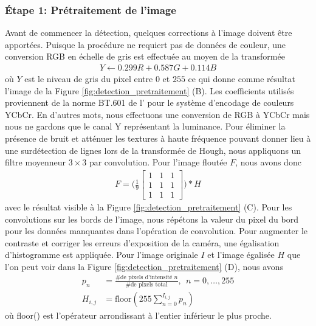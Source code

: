 \subsubsection{Étape 1: Prétraitement de l'image} Avant de commencer la détection, quelques corrections à l'image doivent être apportées. Puisque la procédure ne requiert pas de données de couleur, une conversion RGB en échelle de gris est effectuée au moyen de la transformée
\begin{align}
 Y \leftarrow 0.299 R + 0.587 G + 0.114 B
 \label{eq:rgb2gray}
\end{align}
où $Y$ est le niveau de gris du pixel entre $0$ et $255$ ce qui donne comme résultat l'image de la Figure \ref{fig:detection_pretraitement} (B). Les coefficients utilisés proviennent de la norme BT.601 de l'\cite{BT601Stu24online} pour le système d'encodage de couleurs YCbCr. En d'autres mots, nous effectuons une conversion de RGB à YCbCr mais nous ne gardons que le canal Y représentant la luminance. Pour éliminer la présence de bruit et atténuer les textures à haute fréquence pouvant donner lieu à une surdétection de lignes lors de la transformée de Hough, nous appliquons un filtre moyenneur $3 \times 3$ par convolution. Pour l'image floutée $F$, nous avons donc
\begin{align}
  F = \Bigg(\frac{1}{9}
    \begin{bmatrix}
      1 & 1 & 1\\
      1 & 1 & 1\\
      1 & 1 & 1
    \end{bmatrix}
  \Bigg) * H
  \label{eq:boxfilter}
\end{align}
avec le résultat visible à la Figure \ref{fig:detection_pretraitement} (C). Pour les convolutions sur les bords de l'image, nous répétons la valeur du pixel du bord pour les données manquantes dans l'opération de convolution. Pour augmenter le contraste et corriger les erreurs d'exposition de la caméra, une égalisation d'histogramme est appliquée. Pour l'image originale $I$ et l'image égalisée $H$ que l'on peut voir dans la Figure \ref{fig:detection_pretraitement} (D), nous avons
\begin{align}
  p_n &= \frac{\text{\# de pixels d'intensité } n }{\text{\# de pixels total}}, \ \ n = 0, \ldots, 255 \\
  H_{i,j} &= \text{floor}(255 \sum_{n=0}^{I_{i,j}} p_n)
  \label{eq:egalisation_histogramme}
\end{align}
où floor() est l'opérateur arrondissant à l'entier inférieur le plus proche.
